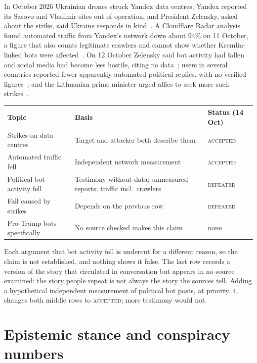 \documentclass[11pt]{article}
\begin{document}
In October 2026 Ukrainian drones struck Yandex data centres; Yandex
reported its Sasovo and Vladimir sites out of operation, and President
Zelensky, asked about the strike, said Ukraine responds in
kind~\cite{liga1,euronews}. A Cloudflare Radar analysis found automated
traffic from Yandex's network down about 94\% on 11 October, a figure
that also counts legitimate crawlers and cannot show whether
Kremlin-linked bots were affected~\cite{euronews}. On 12 October
Zelensky said bot activity had fallen and social media had become less
hostile, citing no data~\cite{liga2}; users in several countries reported
fewer apparently automated political replies, with no verified
figures~\cite{euronews}; and the Lithuanian prime minister urged allies to
seek more such strikes~\cite{malaymail}.

\begin{center}\small
\begin{tabularx}{\linewidth}{@{}l X l@{}}
\toprule
Topic & Basis & Status (14 Oct)\\
\midrule
Strikes on data centres & Target and attacker both describe them & \textsc{accepted}\\
Automated traffic fell & Independent network measurement & \textsc{accepted}\\
Political bot activity fell & Testimony without data; unmeasured reports; traffic incl.\ crawlers & \textsc{defeated}\\
Fall caused by strikes & Depends on the previous row & \textsc{defeated}\\
Pro-Trump bots specifically & No source checked makes this claim & none\\
\bottomrule
\end{tabularx}
\end{center}

Each argument that bot activity fell is undercut for a different reason,
so the claim is not established, and nothing shows it false. The last
row records a version of the story that circulated in conversation but
appears in no source examined: the story people repeat is not always the
story the sources tell. Adding a hypothetical independent measurement of
political bot posts, at priority~4, changes both middle rows to
\textsc{accepted}; more testimony would not.

\section{Epistemic stance and conspiracy numbers}
\label{sec:stance}
\end{document}
